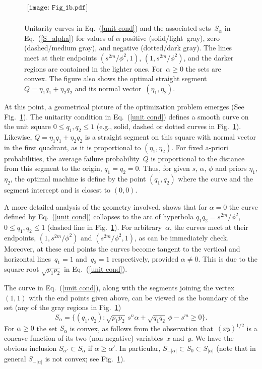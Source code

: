 \documentclass[aps,prl,twocolumn,showpacs]{revtex4}
\begin{document}
\begin{figure}[h]
\centering
$%
\begin{array}{c}
\texttt{[image: Fig\_1b.pdf]}\\
\end{array}%
$%
\caption{Unitarity curves in Eq.~(\ref{unit cond}) and the associated sets~$S_\alpha$ in Eq.~(\ref{S_alpha}) for values of $\alpha$ positive (solid/light~gray), zero (dashed/medium gray), and negative (dotted/dark gray). The lines meet at their endpoints $(s^{2m}/\phi^2,1)$, $(1,s^{2m}/\phi^2)$, and the darker regions are contained in the lighter ones. For~$\alpha\ge0$ the sets are convex. The figure also shows the optimal straight segment~$Q=\eta_1 q_1+\eta_2 q_2$ and its normal vector~$(\eta_1,\eta_2)$.}
\label{fig:1}
\end{figure}


At this point, a geometrical picture of the optimization problem emerges (See Fig.~\ref{fig:1}). The unitarity condition in Eq.~(\ref{unit cond}) defines a smooth curve on the unit square $0\le q_1,q_2\le 1$ (e.g., solid, dashed or dotted curves in Fig.~\ref{fig:1}). Likewise,  $Q=\eta_1 q_1+\eta_2 q_2$ is a straight segment on this square with normal vector in the first quadrant, as it is proportional to $(\eta_1,\eta_2)$. For fixed a-priori probabilities, the average failure probability~$Q$ is proportional to the distance from this segment to the origin, $q_1=q_2=0$. Thus, for given $s$, $\alpha$, $\phi$ and priors $\eta_1$, $\eta_2$, the optimal machine is define by the point $(q_1,q_2)$ where the curve and the segment intercept and is closest to $(0,0)$. 


A more detailed analysis of the geometry involved, shows that for $\alpha=0$ the curve defined by Eq.~(\ref{unit cond}) collapses to the arc of hyperbola $q_1 q_2=s^{2m}/\phi^2$, $0\le q_1,q_2\le 1$ (dashed line in Fig.~\ref{fig:1}). For arbitrary~$\alpha$, the curves meet at their endpoints, $(1,s^{2m}/\phi^2)$ and $(s^{2m}/\phi^2,1)$, as can be immediately check. Moreover, at these end points the curves become tangent to the vertical and horizontal lines~$q_1=1$ and~$q_2=1$ respectively, provided $\alpha\not=0$. This is due to the square root $\sqrt{p_1p_2}$ in Eq.~(\ref{unit cond}).


The curve in Eq.~(\ref{unit cond}), along with the segments joining the vertex~$(1,1)$ with the end points given above, can be viewed as the boundary of the set (any of the gray regions in Fig.~\ref{fig:1})
%
\begin{equation}
S_\alpha=\{ (q_1,q_2): \sqrt{p_1 p_2}\,s^n\alpha+\sqrt{q_1 q_2}\,\phi-s^m\ge 0\}.
\label{S_alpha}
\end{equation}
%
For $\alpha\ge0$ the set $S_\alpha$ is convex, as follows from the observation that~$(xy)^{1/2}$ is a concave function of its two (non-negative) variables~$x$ and~$y$. We have the obvious inclusion $S_{\alpha'}\subset S_{\alpha}$ if $\alpha\ge\alpha'$. In particular, $S_{-|\alpha|}\subset S_0\subset S_{|\alpha|}$ (note that in general  $S_{-|\alpha|}$ is not convex; see Fig.~\ref{fig:1}).
\end{document}
